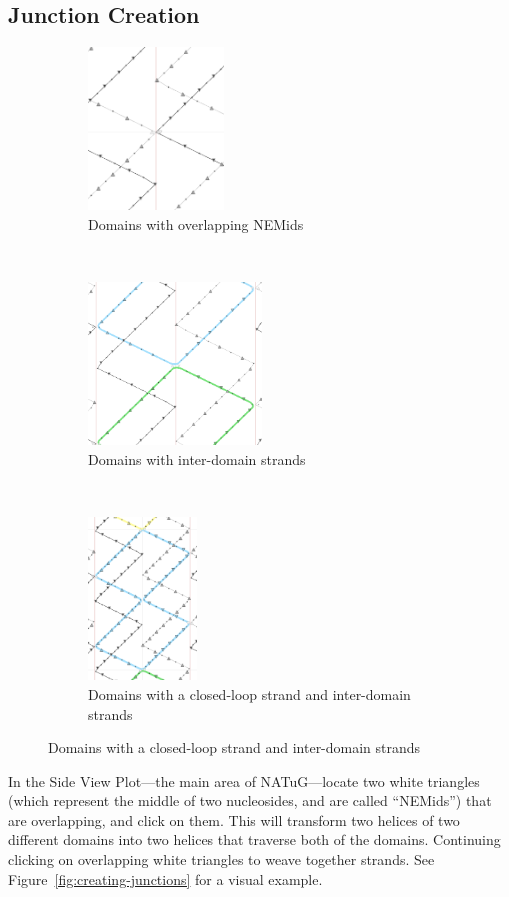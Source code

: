 \documentclass[titlepage]{article}
\begin{document}
\subsection{Junction Creation}
\begin{figure}[h]
	\centering
	\caption{Creating cross-strand junctions}
	\label{fig:creating-junctions}
	
	\begin{subfigure}{.3\textwidth}
		\centering
		\includegraphics[height=1.7in]{creating-junctions-1.png}
		\caption{Domains with overlapping NEMids}
	\end{subfigure}%
	~
	\begin{subfigure}{.3\textwidth}
		\centering
		\includegraphics[height=1.7in]{creating-junctions-2.png}
		\caption{Domains with inter-domain strands}
	\end{subfigure}%
	~
	\begin{subfigure}{.3\textwidth}
		\centering
		\includegraphics[height=1.7in]{creating-junctions-3.png}
		\caption{Domains with a closed-loop strand and inter-domain strands}
	\end{subfigure}
\end{figure}

In the Side View Plot---the main area of NATuG---locate two white triangles (which represent the middle of two nucleosides, and are called ``NEMids'') that are overlapping, and click on them. This will transform two helices of two different domains into two helices that traverse both of the domains. Continuing clicking on overlapping white triangles to weave together strands. See Figure~\ref{fig:creating-junctions} for a visual example.
\end{document}
